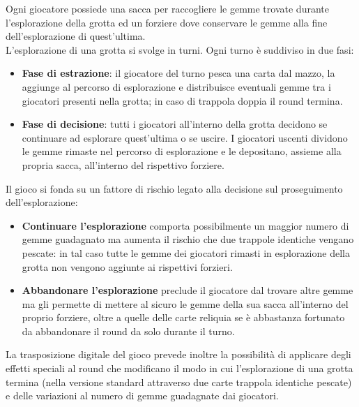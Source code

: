 \documentclass[a4paper,12pt]{report}
\begin{document}
Ogni giocatore possiede una sacca per raccogliere le gemme trovate durante l'esplorazione della grotta
ed un forziere dove conservare le gemme alla fine dell'esplorazione di quest'ultima.
\\
L'esplorazione di una grotta si svolge in turni. Ogni turno
è suddiviso in due fasi:
\begin{itemize}
	\item \textbf{Fase di estrazione}: il giocatore del turno pesca una carta dal mazzo, la aggiunge al percorso di esplorazione
		e distribuisce eventuali gemme tra i giocatori presenti nella grotta; in caso di trappola doppia
		il round termina. 
	\item \textbf{Fase di decisione}: tutti i giocatori all'interno della grotta decidono se continuare
		ad esplorare quest'ultima o se uscire. I giocatori uscenti dividono le gemme rimaste nel percorso di esplorazione
		e le depositano, assieme alla propria sacca, all'interno del rispettivo forziere.
\end{itemize}

Il gioco si fonda su un fattore di rischio legato alla decisione sul proseguimento dell'esplorazione:
\begin{itemize}
	\item \textbf{Continuare l'esplorazione} comporta possibilmente un maggior numero di gemme guadagnato
	ma aumenta il rischio che due trappole identiche vengano pescate: in tal caso tutte le gemme
	dei giocatori rimasti in esplorazione della grotta non vengono aggiunte ai rispettivi forzieri.
	\item \textbf{Abbandonare l'esplorazione} preclude il giocatore dal trovare altre gemme ma gli permette
	di mettere al sicuro le gemme della sua sacca all'interno del proprio forziere, oltre a quelle delle
	carte reliquia se è abbastanza fortunato da abbandonare il round da solo durante il turno.
\end{itemize}
La trasposizione digitale del gioco prevede inoltre la possibilità di applicare
degli effetti speciali al round che modificano il modo in cui l'esplorazione di una grotta termina
(nella versione standard attraverso due carte trappola identiche pescate) e delle variazioni
al numero di gemme guadagnate dai giocatori.
\end{document}
